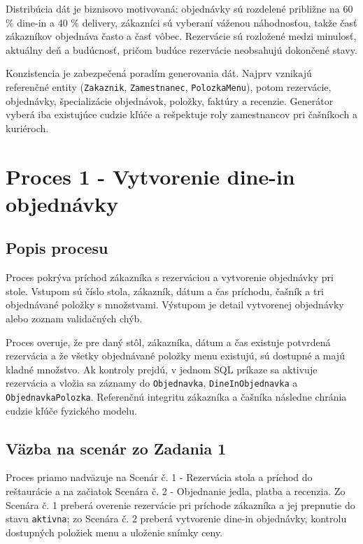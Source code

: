 \documentclass[11pt, a4paper]{article}
\begin{document}
Distribúcia dát je biznisovo motivovaná: objednávky sú rozdelené približne na 60 \% dine-in a
40 \% delivery, zákazníci sú vyberaní váženou náhodnosťou, takže časť zákazníkov objednáva často a
časť vôbec. Rezervácie sú rozložené medzi minulosť, aktuálny deň a budúcnosť, pričom budúce
rezervácie neobsahujú dokončené stavy.

Konzistencia je zabezpečená poradím generovania dát. Najprv vznikajú referenčné entity
(\texttt{Zakaznik}, \texttt{Zamestnanec}, \texttt{PolozkaMenu}), potom rezervácie, objednávky,
špecializácie objednávok, položky, faktúry a recenzie. Generátor vyberá iba existujúce cudzie kľúče
a rešpektuje roly zamestnancov pri čašníkoch a kuriéroch.

\clearpage
\section{Proces 1 - Vytvorenie dine-in objednávky}

\subsection*{Popis procesu}

Proces pokrýva príchod zákazníka s rezerváciou a vytvorenie objednávky pri stole. Vstupom sú
číslo stola, zákazník, dátum a čas príchodu, čašník a tri objednávané položky s množstvami.
Výstupom je detail vytvorenej objednávky alebo zoznam validačných chýb.

Proces overuje, že pre daný stôl, zákazníka, dátum a čas existuje potvrdená rezervácia a že všetky
objednávané položky menu existujú, sú dostupné a majú kladné množstvo. Ak kontroly prejdú, v jednom
SQL príkaze sa aktivuje rezervácia a vložia sa záznamy do \texttt{Objednavka},
\texttt{DineInObjednavka} a \texttt{ObjednavkaPolozka}. Referenčnú integritu zákazníka a čašníka
následne chránia cudzie kľúče fyzického modelu.

\subsection*{Väzba na scenár zo Zadania 1}

Proces priamo nadväzuje na Scenár č. 1 - Rezervácia stola a príchod do reštaurácie a na začiatok
Scenára č. 2 - Objednanie jedla, platba a recenzia. Zo Scenára č. 1 preberá overenie rezervácie pri
príchode zákazníka a jej prepnutie do stavu \texttt{aktivna}; zo Scenára č. 2 preberá vytvorenie
dine-in objednávky, kontrolu dostupných položiek menu a uloženie snímky ceny.
\end{document}
